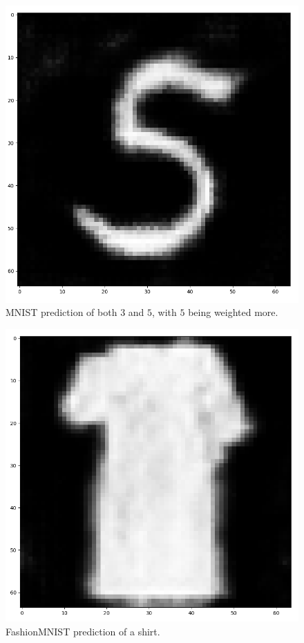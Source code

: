 \documentclass[10pt,twocolumn,letterpaper]{article}
\begin{document}
\begin{figure}
   \centering
   \includegraphics[scale=0.39]{images/gen35with5weighted.png}
   \caption{MNIST prediction of both $3$ and $5$, with $5$ being weighted more.}
   \label{fig:mnist-35w}
\end{figure}

\begin{figure}
   \centering
   \includegraphics[scale=0.39]{images/shirt.png}
   \caption{FashionMNIST prediction of a shirt.}
   \label{fig:fashion-shirt}
\end{figure}
\end{document}
